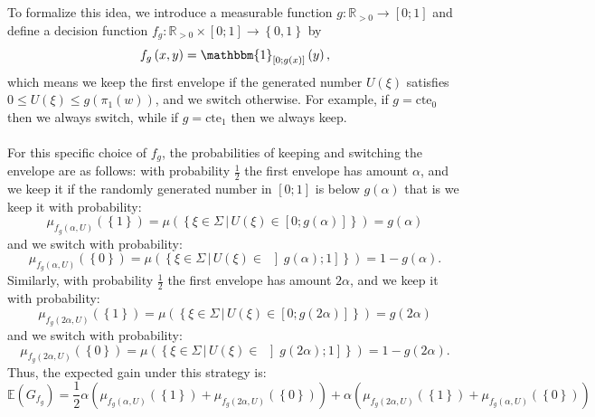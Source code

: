 \begin{solution}
    \\\\
    To formalize this idea, we introduce a measurable function \( g: \mathbb{R}_{>0} \to \left[0;1\right] \) and define a decision function \( f_g: \mathbb{R}_{>0} \times \left[0;1\right] \to \left\{0,1\right\} \) by
    \[
        f_g\left(x, y\right) = \mathbbm{1}_{\left[0;g\left(x\right)\right]}\left(y\right),
    \]
    which means we keep the first envelope if the generated number \( U\left(\xi\right) \) satisfies \( 0\leq U\left(\xi\right) \leq g\left(\pi_1\left(w\right)\right) \), and we switch otherwise. For example, if \( g=\text{cte}_0 \) then we always switch, while if \( g=\text{cte}_1 \) then we always keep.
    \\\\
    For this specific choice of \( f_g \), the probabilities of keeping and switching the envelope are as follows: with probability \( \frac{1}{2} \) the first envelope has amount \( \alpha \), and we keep it if the randomly generated number in \( \left[0;1\right] \) is below \( g\left(\alpha\right) \) that is we keep it with probability:
    \[
        \mu_{f_g\left(\alpha, U\right)}\left(\left\{1\right\}\right)=\mu\left(\left\{\xi\in\Sigma\,|\, U\left(\xi\right)\in\left[0;g\left(\alpha\right)\right]\right\}\right)=g\left(\alpha\right)
    \]
    and we switch with probability:
    \[
        \mu_{f_g\left(\alpha, U\right)}\left(\left\{0\right\}\right)=\mu\left(\left\{\xi\in\Sigma\,|\, U\left(\xi\right)\in\;\left]g\left(\alpha\right);1\right]\right\}\right)=1-g\left(\alpha\right).
    \]
    Similarly, with probability \( \frac{1}{2} \) the first envelope has amount \( 2\alpha \), and we keep it with probability:
    \[
        \mu_{f_g\left(2\alpha, U\right)}\left(\left\{1\right\}\right)=\mu\left(\left\{\xi\in\Sigma\,|\, U\left(\xi\right)\in\left[0;g\left(2\alpha\right)\right]\right\}\right)=g\left(2\alpha\right)
    \]
    and we switch with probability:
    \[
        \mu_{f_g\left(2\alpha, U\right)}\left(\left\{0\right\}\right)=\mu\left(\left\{\xi\in\Sigma\,|\, U\left(\xi\right)\in\;\left]g\left(2\alpha\right);1\right]\right\}\right)=1-g\left(2\alpha\right).
    \]
    Thus, the expected gain under this strategy is:
    \[
        \mathbb{E}\left(G_{f_g}\right) = \frac{1}{2} \alpha \left( \mu_{f_g\left(\alpha, U\right)}\left(\left\{1\right\}\right) + \mu_{f_g\left(2\alpha, U\right)}\left(\left\{0\right\}\right) \right) + \alpha \left( \mu_{f_g\left(2\alpha, U\right)}\left(\left\{1\right\}\right) + \mu_{f_g\left(\alpha, U\right)}\left(\left\{0\right\}\right) \right)
\]
\end{solution}
